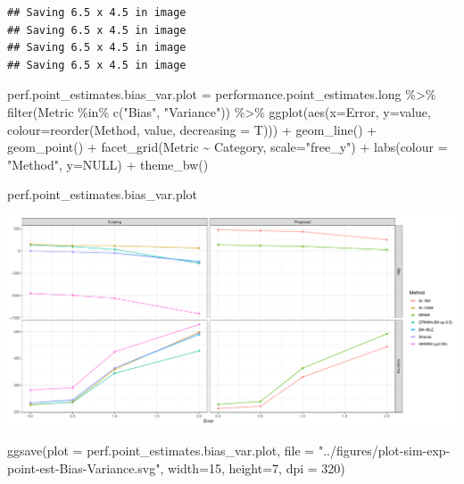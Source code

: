\documentclass[
]{article}
\newenvironment{Shaded}{\begin{snugshade}}{\end{snugshade}}
\newcommand{\AttributeTok}[1]{\textcolor[rgb]{0.77,0.63,0.00}{#1}}
\newcommand{\ConstantTok}[1]{\textcolor[rgb]{0.00,0.00,0.00}{#1}}
\newcommand{\DecValTok}[1]{\textcolor[rgb]{0.00,0.00,0.81}{#1}}
\newcommand{\FunctionTok}[1]{\textcolor[rgb]{0.00,0.00,0.00}{#1}}
\newcommand{\NormalTok}[1]{#1}
\newcommand{\OtherTok}[1]{\textcolor[rgb]{0.56,0.35,0.01}{#1}}
\newcommand{\SpecialCharTok}[1]{\textcolor[rgb]{0.00,0.00,0.00}{#1}}
\newcommand{\StringTok}[1]{\textcolor[rgb]{0.31,0.60,0.02}{#1}}
\begin{document}
\begin{verbatim}
## Saving 6.5 x 4.5 in image
## Saving 6.5 x 4.5 in image
## Saving 6.5 x 4.5 in image
## Saving 6.5 x 4.5 in image
\end{verbatim}

\begin{Shaded}
\begin{Highlighting}[]
\NormalTok{perf.point\_estimates.bias\_var.plot }\OtherTok{=}\NormalTok{ performance.point\_estimates.long }\SpecialCharTok{\%\textgreater{}\%}
  \FunctionTok{filter}\NormalTok{(Metric }\SpecialCharTok{\%in\%} \FunctionTok{c}\NormalTok{(}\StringTok{"Bias"}\NormalTok{, }\StringTok{"Variance"}\NormalTok{)) }\SpecialCharTok{\%\textgreater{}\%}
  \FunctionTok{ggplot}\NormalTok{(}\FunctionTok{aes}\NormalTok{(}\AttributeTok{x=}\NormalTok{Error, }\AttributeTok{y=}\NormalTok{value, }\AttributeTok{colour=}\FunctionTok{reorder}\NormalTok{(Method, value, }\AttributeTok{decreasing =}\NormalTok{ T))) }\SpecialCharTok{+}
  \FunctionTok{geom\_line}\NormalTok{() }\SpecialCharTok{+}
  \FunctionTok{geom\_point}\NormalTok{() }\SpecialCharTok{+}
  \FunctionTok{facet\_grid}\NormalTok{(Metric }\SpecialCharTok{\textasciitilde{}}\NormalTok{ Category, }\AttributeTok{scale=}\StringTok{"free\_y"}\NormalTok{) }\SpecialCharTok{+}
  \FunctionTok{labs}\NormalTok{(}\AttributeTok{colour =} \StringTok{"Method"}\NormalTok{, }\AttributeTok{y=}\ConstantTok{NULL}\NormalTok{) }\SpecialCharTok{+}
  \FunctionTok{theme\_bw}\NormalTok{()}

\NormalTok{perf.point\_estimates.bias\_var.plot}
\end{Highlighting}
\end{Shaded}

\includegraphics{sim_exp-results_files/figure-latex/unnamed-chunk-8-1.pdf}

\begin{Shaded}
\begin{Highlighting}[]
\FunctionTok{ggsave}\NormalTok{(}\AttributeTok{plot =}\NormalTok{ perf.point\_estimates.bias\_var.plot,}
       \AttributeTok{file =} \StringTok{"../figures/plot{-}sim{-}exp{-}point{-}est{-}Bias{-}Variance.svg"}\NormalTok{,}
       \AttributeTok{width=}\DecValTok{15}\NormalTok{, }\AttributeTok{height=}\DecValTok{7}\NormalTok{,}
       \AttributeTok{dpi =} \DecValTok{320}\NormalTok{)}
\end{Highlighting}
\end{Shaded}
\end{document}
